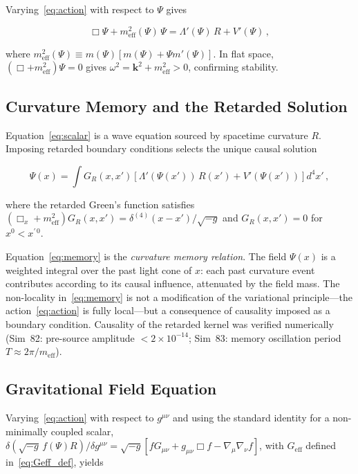 \documentclass[12pt,a4paper]{article}
\begin{document}
Varying~\eqref{eq:action} with respect to $\Psi$ gives

\begin{equation}
\label{eq:scalar}
\Box\Psi + m_{\mathrm{eff}}^2(\Psi)\,\Psi
= \Lambda'(\Psi)\,R + V'(\Psi)\,,
\end{equation}

where $m_{\mathrm{eff}}^2(\Psi) \equiv m(\Psi)[m(\Psi) + \Psi m'(\Psi)]$.
In flat space, $(\Box + m_{\mathrm{eff}}^2)\Psi = 0$ gives
$\omega^2 = \mathbf{k}^2 + m_{\mathrm{eff}}^2 > 0$, confirming stability.

\subsection{Curvature Memory and the Retarded Solution}
\label{sec:memory}

Equation~\eqref{eq:scalar} is a wave equation sourced by spacetime curvature $R$.
Imposing retarded boundary conditions selects the unique causal solution

\begin{equation}
\label{eq:memory}
\boxed{
\Psi(x) = \int G_R(x,x')\left[
  \Lambda'(\Psi(x'))\,R(x') + V'(\Psi(x'))
\right]d^4x'\,,
}
\end{equation}

where the retarded Green's function satisfies
$(\Box_x + m_{\mathrm{eff}}^2)G_R(x,x') = \delta^{(4)}(x-x')/\sqrt{-g}$
and $G_R(x,x') = 0$ for $x^0 < x^{\prime\,0}$.

Equation~\eqref{eq:memory} is the \emph{curvature memory relation}. The field
$\Psi(x)$ is a weighted integral over the past light cone of $x$: each past
curvature event contributes according to its causal influence, attenuated by
the field mass. The non-locality in~\eqref{eq:memory} is not a modification of
the variational principle---the action~\eqref{eq:action} is fully local---but
a consequence of causality imposed as a boundary condition. Causality of the
retarded kernel was verified numerically (Sim~82: pre-source amplitude
$< 2\times 10^{-14}$; Sim~83: memory oscillation period $T \approx 2\pi/m_{\mathrm{eff}}$).

\subsection{Gravitational Field Equation}
\label{sec:grav_eq}

Varying~\eqref{eq:action} with respect to $g^{\mu\nu}$ and using the standard
identity for a non-minimally coupled scalar,
$\delta(\sqrt{-g}\,f(\Psi)R)/\delta g^{\mu\nu}
= \sqrt{-g}[fG_{\mu\nu} + g_{\mu\nu}\Box f - \nabla_\mu\nabla_\nu f]$,
with $G_{\mathrm{eff}}$ defined in~\eqref{eq:Geff_def}, yields
\end{document}
